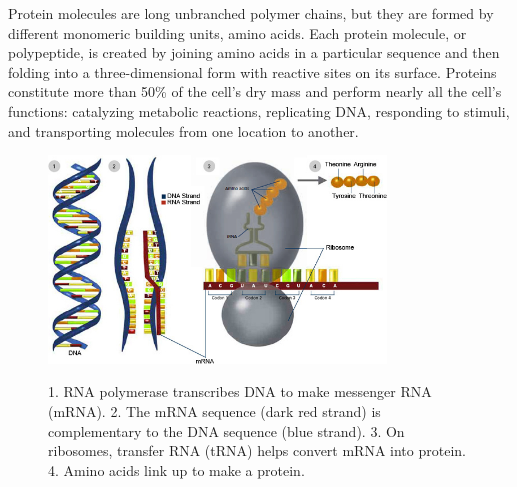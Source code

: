 \documentclass[11pt, a4paper,oneside]{report}
\begin{document}
Protein molecules are long unbranched polymer chains, but they are formed by different monomeric building units, amino acids. Each protein molecule, or polypeptide, is created by joining amino acids in a particular sequence and then folding into a three-dimensional form with reactive sites on its surface. Proteins constitute more than 50\%  of the cell's dry mass\cite{Alberts2007} and perform nearly all the cell’s functions: catalyzing metabolic reactions, replicating DNA, responding to stimuli, and transporting molecules from one location to another.
\begin{figure}[hb]
\begin{center}
\label{img:dnatoprotein}
\includegraphics[width=0.8\textwidth]{figures/dna_to_protein.jpg}
\end{center}
\caption{1. RNA polymerase transcribes DNA to make messenger RNA (mRNA). 2. The mRNA sequence (dark red strand) is complementary to the DNA sequence (blue strand). 3. On ribosomes, transfer RNA (tRNA) helps convert mRNA into protein. 4. Amino acids link up to make a protein.} 
\end{figure}
\end{document}
